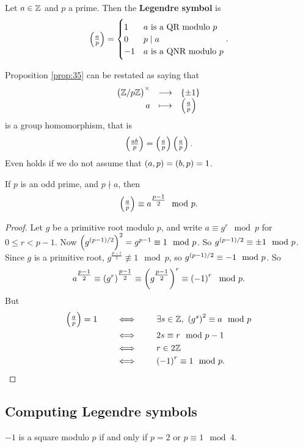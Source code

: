 \begin{definition}
Let $ a \in \mathbb{Z} $ and $ p $ a prime. Then the \textbf{Legendre symbol} is
$$ \jacobi{a}{p} =
\begin{cases}
1 & a \ \text{is a QR modulo} \ p \\
0 & p \mid a \\
-1 & a \ \text{is a QNR modulo} \ p
\end{cases}.
$$
\end{definition}

Proposition \ref{prop:35} can be restated as saying that
$$ \function{\unit{p}}{\cbr{\pm 1}}{a}{\jacobi{a}{p}} $$
is a group homomorphism, that is
$$ \jacobi{ab}{p} = \jacobi{a}{p}\jacobi{a}{p}. $$
Even holds if we do not assume that $ \br{a, p} = \br{b, p} = 1 $.


\begin{theorem}
If $ p $ is an odd prime, and $ p \nmid a $, then
$$ \jacobi{a}{p} \equiv a^{\tfrac{p - 1}{2}} \mod p. $$
\end{theorem}

\pagebreak

\begin{proof}
Let $ g $ be a primitive root modulo $ p $, and write $ a \equiv g^r \mod p $ for $ 0 \le r < p - 1 $. Now $ \br{g^{\br{p - 1} / 2}}^2 = g^{p - 1} \equiv 1 \mod p $. So $ g^{\br{p - 1} / 2} \equiv \pm 1 \mod p $. Since $ g $ is a primitive root, $ g^{\tfrac{p - 1}{2}} \not\equiv 1 \mod p $, so $ g^{\br{p - 1} / 2} \equiv -1 \mod p $. So
$$ a^{\tfrac{p - 1}{2}} \equiv \br{g^r}^{\tfrac{p - 1}{2}} \equiv \br{g^{\tfrac{p - 1}{2}}}^r \equiv \br{-1}^r \mod p. $$
But
\begin{align*}
\jacobi{a}{p} = 1 \qquad
& \iff \qquad \exists s \in \ZZ, \ \br{g^s}^2 \equiv a \mod p \\
& \iff \qquad 2s \equiv r \mod p - 1 \\
& \iff \qquad r \in 2\ZZ \\
& \iff \qquad \br{-1}^r \equiv 1 \mod p.
\end{align*}
\end{proof}

\subsection{Computing Legendre symbols}

\begin{proposition}
$ -1 $ is a square modulo $ p $ if and only if $ p = 2 $ or $ p \equiv 1 \mod 4 $.
\end{proposition}

